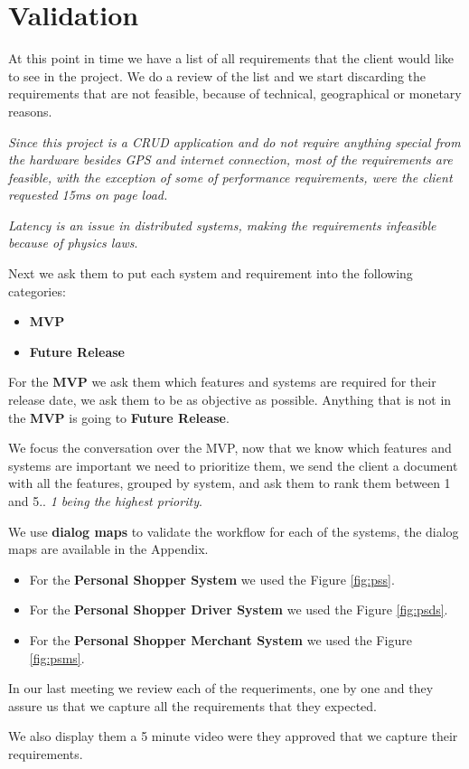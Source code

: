 \section{Validation }
At this point in time we have a list of all requirements that the client would 
like to see in the project. We do a review of the list and we start discarding 
the requirements that are not feasible, because of technical, geographical or 
monetary reasons. \newline

\noindent \textit{Since this project is a CRUD application \cite{crud} and do 
not require anything special from the hardware besides GPS and internet 
connection, most of the requirements are feasible, with the exception of 
some of performance requirements, were the client 
requested 15ms on page load.}\newline

\noindent \textit{Latency is an issue in distributed systems, making the 
requirements infeasible because of physics laws}. \newline

\noindent Next we ask them to put each system and requirement into the 
following categories:
\begin{itemize}
    \item \textbf{MVP} \cite{mvp}
    \item \textbf{Future Release}
\end{itemize}

\noindent For the \textbf{MVP} we ask them which features and systems are 
required for their release date, we ask them to be as objective as possible. 
Anything that is not in the \textbf{MVP} is going to 
\textbf{Future Release}. \newline

\noindent We focus the conversation over the MVP, now that we know which 
features and systems are important we need to prioritize them,  we send the 
client a document with all the features, grouped by system, and ask them to 
rank them between 1 and 5.. \textit{1 being the highest priority}. \newline

\noindent We use \textbf{dialog maps} to validate the workflow for each of 
the systems, the dialog maps are available in the Appendix. 
\begin{itemize}
    \item For the \textbf{Personal Shopper System} we used 
    the Figure \ref{fig:pss}. 
    \item For the \textbf{Personal Shopper Driver System} we used 
    the Figure \ref{fig:psds}. 
    \item For the \textbf{Personal Shopper Merchant System} we used 
    the Figure \ref{fig:psms}. 
\end{itemize}

\noindent In our last meeting we review each of the requeriments, one by one 
and they assure us that we capture all the requirements that they 
expected. \linebreak

\noindent We also display them a 5 minute video were they approved that we 
capture their requirements.
